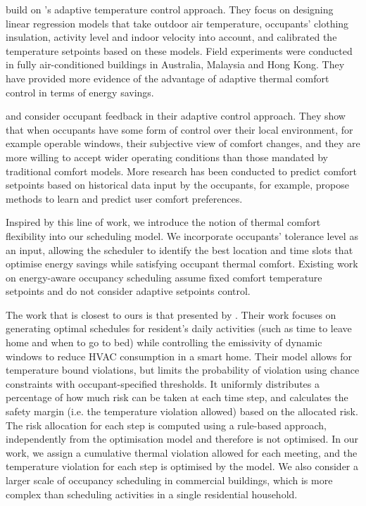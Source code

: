\cite{egan2010the,chew2015adaptive,mui2003adaptive} build on \cite{de1998developing}'s adaptive temperature control approach. They focus on designing linear regression models that take outdoor air temperature, occupants' clothing insulation, activity level and indoor velocity into account, and calibrated the temperature setpoints based on these models. Field experiments were conducted in fully air-conditioned buildings in Australia, Malaysia and Hong Kong. They have provided more evidence of the advantage of adaptive thermal comfort control in terms of energy savings. 

\cite{ward2010automate} and \cite{west2014trial} consider occupant feedback in their adaptive control approach. They show that when occupants have some form of control over their local environment, for example operable windows, their subjective view of comfort changes, and they are more willing to accept wider operating conditions than those mandated by traditional comfort models. More research has been conducted to predict comfort setpoints based on historical data input by the occupants, for example, \cite{schumann2010learning} propose methods to learn and predict user comfort preferences.

Inspired by this line of work, we introduce the notion of thermal comfort flexibility into our scheduling model. We incorporate occupants' tolerance level as an input, allowing the scheduler to identify the best location and time slots that optimise energy savings while satisfying occupant thermal comfort. Existing work on energy-aware occupancy scheduling \citep{chai2014minimizing,lim2015hvac,lim2015large,majumdar2016characterising,majumdar2012energy,pan2013minimizing,pan2012thermal} assume fixed comfort temperature setpoints and do not consider adaptive setpoints control. 

The work that is closest to ours is that presented by \cite{ono2012risk}. Their work focuses on generating optimal schedules for resident's daily activities (such as time to leave home and when to go to bed) while controlling the emissivity of dynamic windows to reduce HVAC consumption in a smart home. Their model allows for temperature bound violations, but limits the probability of violation using chance constraints with occupant-specified thresholds. It uniformly distributes a percentage of how much risk can be taken at each time step, and calculates the safety margin (i.e. the temperature violation allowed) based on the allocated risk. The risk allocation for each step is computed using a rule-based approach, independently from the optimisation model and therefore is not optimised. In our work, we assign a cumulative thermal violation allowed for each meeting, and the temperature violation for each step is optimised by the model. We also consider a larger scale of occupancy scheduling in commercial buildings, which is more complex than scheduling activities in a single residential household.

